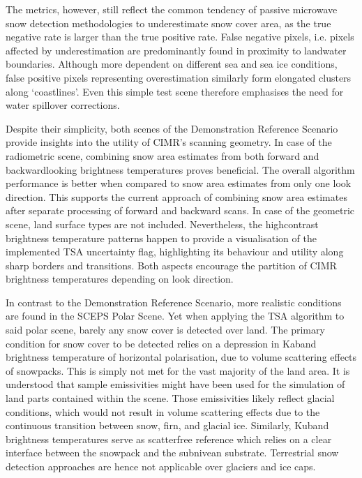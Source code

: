 \documentclass[letterpaper,10pt,english]{jupyterBook}
\begin{document}
\sphinxAtStartPar
The metrics, however, still reflect the common tendency of passive microwave snow detection methodologies to underestimate snow cover area, as the true negative rate is larger than the true positive rate.
False negative pixels, i.e. pixels affected by underestimation are predominantly found in proximity to land\sphinxhyphen{}water boundaries.
Although more dependent on different sea and sea ice conditions, false positive pixels representing overestimation similarly form elongated clusters along ‘coastlines’.
Even this simple test scene therefore emphasises the need for water spill\sphinxhyphen{}over corrections.

\sphinxAtStartPar
Despite their simplicity, both scenes of the Demonstration Reference Scenario provide insights into the utility of CIMR’s scanning geometry.
In case of the radiometric scene, combining snow area estimates from both forward and backward\sphinxhyphen{}looking brightness temperatures proves beneficial.
The overall algorithm performance is better when compared to snow area estimates from only one look direction.
This supports the current approach of combining snow area estimates after separate processing of forward and backward scans.
In case of the geometric scene, land surface types are not included.
Nevertheless, the high\sphinxhyphen{}contrast brightness temperature patterns happen to provide a visualisation of the implemented TSA uncertainty flag, highlighting its behaviour and utility along sharp borders and transitions.
Both aspects encourage the partition of CIMR brightness temperatures depending on look direction.

\sphinxAtStartPar
In contrast to the Demonstration Reference Scenario, more realistic conditions are found in the SCEPS Polar Scene.
Yet when applying the TSA algorithm to said polar scene, barely any snow cover is detected over land.
The primary condition for snow cover to be detected relies on a depression in Ka\sphinxhyphen{}band brightness temperature of horizontal polarisation, due to volume scattering effects of snowpacks.
This is simply not met for the vast majority of the land area.
It is understood that sample emissivities might have been used for the simulation of land parts contained within the scene.
Those emissivities likely reflect glacial conditions, which would not result in volume scattering effects due to the continuous transition between snow, firn, and glacial ice.
Similarly, Ku\sphinxhyphen{}band brightness temperatures serve as scatter\sphinxhyphen{}free reference which relies on a clear interface between the snowpack and the subnivean substrate.
Terrestrial snow detection approaches are hence not applicable over glaciers and ice caps.
\end{document}
